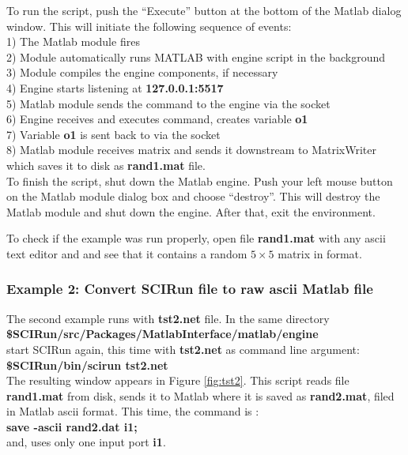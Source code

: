 To run the script, push the ``Execute'' button at the bottom of the
Matlab dialog window. This will initiate the following
sequence of events: \\
1) The Matlab module fires \\
2) Module automatically runs MATLAB with engine script in the background  \\
3) Module compiles the engine components, if necessary \\
4) Engine starts listening at {\bf 127.0.0.1:5517} \\
5) Matlab module sends the command to the engine via the socket\\
6) Engine receives and executes command, creates variable {\bf o1} \\
7) Variable {\bf o1} is sent back to \sr{} via the socket \\
8) \sr{} Matlab module receives matrix and sends it downstream
   to MatrixWriter which saves it to disk as {\bf rand1.mat} file. \\

To finish the script, shut down the Matlab engine. 
Push your left mouse button on the
Matlab module dialog box and choose ``destroy''. This will destroy
the Matlab module and shut down the engine. After that, exit
the \sr{} environment. 

To check if the example was run properly, open file {\bf rand1.mat }
with any ascii text editor and and see that it contains a random
$5 \times 5$ matrix in \sr{} format. 

\subsubsection{Example 2: Convert SCIRun file to raw ascii Matlab file} \indent

The second example runs with {\bf tst2.net} file. In the same
directory \\
{\bf \$SCIRun/src/Packages/MatlabInterface/matlab/engine } \\
start SCIRun again, this time with {\bf tst2.net} as command line argument: \\
{\bf \$SCIRun/bin/scirun  tst2.net} \\

The resulting window appears in Figure \ref{fig:tst2}. This
script reads \sr{} file {\bf rand1.mat} from disk, sends
it to Matlab where it is saved as {\bf rand2.mat}, filed
in Matlab ascii format. This time, the command is : \\
{\bf save -ascii rand2.dat i1;} \\
and, uses only one input port {\bf i1}. 

